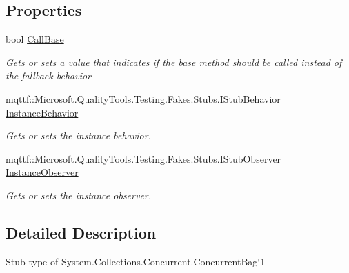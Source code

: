 \subsection*{Properties}
\begin{DoxyCompactItemize}
\item 
bool \hyperlink{class_system_1_1_collections_1_1_concurrent_1_1_fakes_1_1_stub_concurrent_bag_3_01_t_01_4_ad3e3bef5f788d32f2b9a48b27bfa05e7}{Call\-Base}
\begin{DoxyCompactList}\small\item\em Gets or sets a value that indicates if the base method should be called instead of the fallback behavior\end{DoxyCompactList}\item 
mqttf\-::\-Microsoft.\-Quality\-Tools.\-Testing.\-Fakes.\-Stubs.\-I\-Stub\-Behavior \hyperlink{class_system_1_1_collections_1_1_concurrent_1_1_fakes_1_1_stub_concurrent_bag_3_01_t_01_4_a2966a35e1cfa0630a6bf0a4cffb4545d}{Instance\-Behavior}
\begin{DoxyCompactList}\small\item\em Gets or sets the instance behavior.\end{DoxyCompactList}\item 
mqttf\-::\-Microsoft.\-Quality\-Tools.\-Testing.\-Fakes.\-Stubs.\-I\-Stub\-Observer \hyperlink{class_system_1_1_collections_1_1_concurrent_1_1_fakes_1_1_stub_concurrent_bag_3_01_t_01_4_a2236033efcc770cef9a340aa2d85105d}{Instance\-Observer}
\begin{DoxyCompactList}\small\item\em Gets or sets the instance observer.\end{DoxyCompactList}\end{DoxyCompactItemize}


\subsection{Detailed Description}
Stub type of System.\-Collections.\-Concurrent.\-Concurrent\-Bag`1



